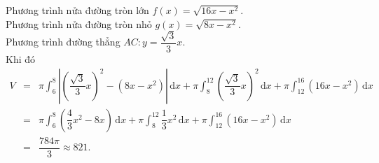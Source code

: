 \begin{bt}
{\begin{center}
		\end{center}
		Phương trình nửa  đường tròn lớn $f(x)=\sqrt{16x-x^2}$.\\
		 Phương trình nửa đường tròn nhỏ $g(x)=\sqrt{8x-x^2}$.\\
		Phương trình đường thẳng  $AC\colon y=\dfrac{\sqrt 3}{3}x$.\\
		Khi đó 
		 \allowdisplaybreaks
		\begin{eqnarray*}
			 V&=&\pi\displaystyle\int_6^8\left|\left(\dfrac{\sqrt 3}{3}x\right)^2-\left(8x-x^2\right)\right|\,\mathrm{d}x+\pi\displaystyle\int_8^{12}{\left(\dfrac{\sqrt 3}{3}x\right)^2\,\mathrm{d}x}+\pi\displaystyle\int_{12}^{16}{\left(16x-x^2\right)\,\mathrm{d}x}\\
			&=&\pi\displaystyle\int_6^8\left(\dfrac{4}{3}x^2-8x\right)\,\mathrm{d}x+\pi\displaystyle\int_8^{12}{\dfrac{1}{3}x^2\,\mathrm{d}x}+\pi\displaystyle\int_{12}^{16}{\left(16x-x^2\right)\,\mathrm{d}x}\\ 
			 &=&\dfrac{784\pi}{3}\approx 821.
		\end{eqnarray*}
	} 
\end{bt}

